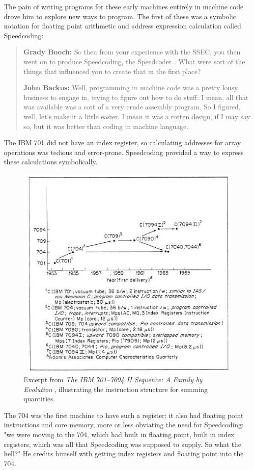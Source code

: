 The pain of writing programs for these early machines entirely in machine code
drove him to explore new ways to program.
The first of these was a symbolic notation for floating point arithmetic
and address expression calculation called Speedcoding\cite{backus_oral_history_2006}:

\begin{quotation}
    \textbf{Grady Booch:}
    So then from your experience with the SSEC, you then went on to produce Speedcoding, the
    Speedcoder\dots
    What were sort of the things that influenced you to create that in the first place? 

    \textbf{John Backus:}
    Well, programming in machine code was a pretty lousy business to engage in, trying to figure
    out how to do stuff. I mean, all that was available was a sort of a very crude assembly program. So I
    figured, well, let's make it a little easier. I mean it was a rotten design, if I may say so, but it was better
    than coding in machine language. 
\end{quotation}

The IBM 701 did not have an index register, so calculating addresses for array
operations was tedious and error-prone.
Speedcoding provided a way to express these calculations symbolically.

\begin{figure}[h!]
  \centering
  \includegraphics[width=0.5\linewidth]{resource/ibm-7094.jpeg}
  \caption{Excerpt from \textit{The IBM 701--7094 II Sequence: A Family by Evolution} 
  \cite{Hamming_Feigenbaum_1971_IBM7094}, illustrating the instruction structure for summing quantities.}
  \label{fig:ibm7094-example}
\end{figure}

The 704 was the first machine to have such a register; it also had floating
point instructions and core memory, more or less obviating the need for Speedcoding:
"we were moving to the 704, which had built in floating point, built in index
registers, which was all that Speedcoding was supposed to supply. So what the hell?"
\cite{backus_oral_history_2006}
He credits himself with getting index registers and floating point into the 704.

